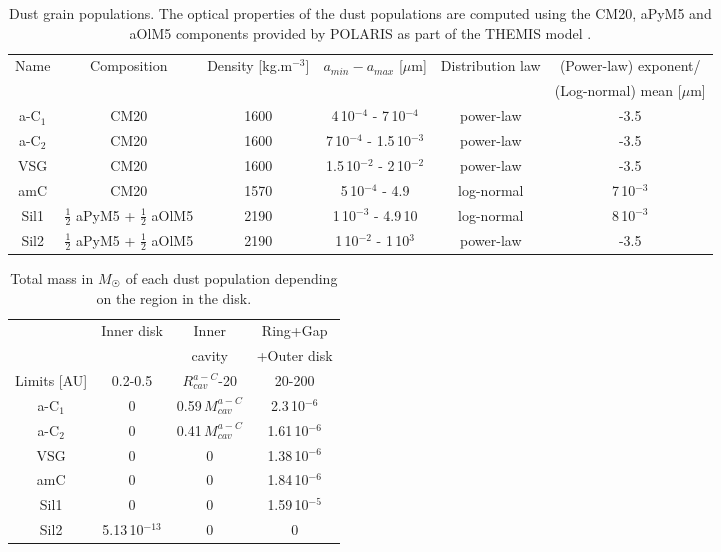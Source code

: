 \documentclass{aa}
\begin{document}
\begin{table*}[!ht]
    \centering
    \caption{Dust grain populations. The optical properties of the dust populations are computed using the CM20, aPyM5 and aOlM5 components provided by POLARIS as part of the THEMIS model \citep{Jones2013, Jones2017}.}
    \label{tab:dustmodel}
    \begin{tabular}{cccccc}
        \hline
         Name & Composition & Density [kg.m$^{-3}$] & $a_{min}-a_{max}$ [$\mu$m] & Distribution law & (Power-law) exponent/ \\
         &&&&&(Log-normal) mean [$\mu$m]\\
         \hline
         a-C$_1$ & CM20 & 1600 & 4\,10$^{-4}$ - 7\,10$^{-4}$ & power-law & -3.5 \\
         a-C$_2$ & CM20 & 1600 & 7\,10$^{-4}$ - 1.5\,10$^{-3}$ & power-law & -3.5 \\
         VSG & CM20 & 1600 & 1.5\,10$^{-2}$ - 2\,10$^{-2}$ & power-law & -3.5 \\
         amC & CM20 & 1570 &  5\,10$^{-4}$ - 4.9 & log-normal & 7\,10$^{-3}$\\
         Sil1 & $\frac{1}{2}$ aPyM5 + $\frac{1}{2}$ aOlM5 & 2190 & 1\,10$^{-3}$ - 4.9\,10 & log-normal & 8\,10$^{-3}$\\
         Sil2 & $\frac{1}{2}$ aPyM5 + $\frac{1}{2}$ aOlM5 & 2190 &  1\,10$^{-2}$ - 1\,10$^{3}$ & power-law & -3.5\\
         \hline
    \end{tabular}
\end{table*}

\begin{table}[!ht]
\centering
\caption{Total mass in $M_{\astrosun}$ of each dust population depending on the region in the disk.}
\label{tab:dustdistribution}
\begin{tabular}{cccc}
        \hline
         &Inner disk&Inner&Ring+Gap\\
         &&cavity&+Outer disk\\
         \hline 
         Limits [AU]& 0.2-0.5&$R_{cav}^{a-C}$-20&20-200 \\
         \hline
         a-C$_1$&0&0.59\,$M_{cav}^{a-C}$&2.3\,10$^{-6}$\\
         a-C$_2$&0&0.41\,$M_{cav}^{a-C}$&1.61\,10$^{-6}$\\
         VSG&0&0&1.38\,10$^{-6}$\\
         amC&0&0&1.84\,10$^{-6}$\\
         Sil1&0&0&1.59\,10$^{-5}$\\
         Sil2&5.13\,10$^{-13}$&0&0\\
         \hline 
\end{tabular}
\end{table}
\end{document}
